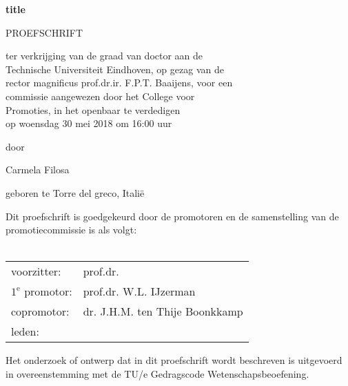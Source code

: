 \begin{center}
\begin{large}
\vspace*{3cm}
\textbf{title}

\vspace*{2cm}

PROEFSCHRIFT

\vspace*{1.5cm}

ter verkrijging van de graad van doctor aan de \\ Technische Universiteit Eindhoven, op gezag van de \\ rector magnificus prof.dr.ir. F.P.T. Baaijens, voor een \\ commissie aangewezen door het College voor \\ Promoties, in het openbaar te verdedigen \\  op woensdag 30 mei 2018 om 16:00 uur 






\vspace*{1.5cm}

door

\vspace*{1.5cm}

Carmela Filosa

\vspace*{1.5cm}

geboren te Torre del greco, Itali\"e 

\end{large}
\end{center}

\clearpage
\thispagestyle{plain}
\begin{large}
\noindent Dit proefschrift is goedgekeurd door de promotoren en de samenstelling van de promotiecommissie is als volgt:\\
\vspace{0.4cm}\\
\begin{tabular}{ll}
voorzitter: & prof.dr. \\
$1^{\text{e}}$ promotor: & prof.dr. W.L. IJzerman \\
copromotor: &  dr. J.H.M. ten Thije Boonkkamp \\
leden: %
\end{tabular}

\vspace*{10cm}
\noindent Het onderzoek of ontwerp dat in dit proefschrift  wordt beschreven is uitgevoerd in overeenstemming met de TU/e Gedragscode Wetenschapsbeoefening.
\end{large}
\clearpage

